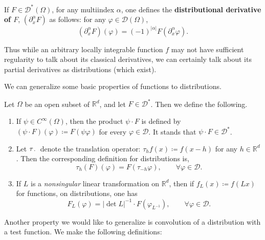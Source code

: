 \documentclass{article}
\begin{document}
\begin{definition}
	If $F \in \mathcal{D}^{\ast}(\Omega)$, for any multiindex $\alpha$, one defines the \textbf{distributional derivative of $F$}, $(\partial_{x}^{\alpha}F)$ as follows: for any $\varphi \in\mathcal{D}(\Omega)$, 
	\begin{equation}
		(\partial_{x}^{\alpha}F)(\varphi) = (-1)^{|\alpha|}F(\partial_{x}^{\alpha}\varphi). 
		\label{eq:dist_der}
	\end{equation}
\end{definition}
Thus while an arbitrary locally integrable function $f$ may not have sufficient regularity to talk about its classical derivatives, we can certainly talk about its partial derivatives as distributions (which exist). 

We can generalize some basic properties of functions to distributions. 

\begin{definition}
	Let $\Omega$ be an open subset of $\mathbb{R}^{d}$, and let $F \in \mathcal{D}^{\ast}$. Then we define the following. \vspace{-1.2em}
	\begin{enumerate}[itemsep =-2pt]
		\item If $\psi \in C^{\infty}(\Omega)$, then the product $\psi \cdot F$ is defined by $(\psi \cdot F)(\varphi) \coloneqq F(\psi \varphi)$ for every $\varphi \in \mathcal{D}$. It stands that $\psi \cdot F \in \mathcal{D}^{\ast}$. 
		\item Let $\tau_{\hspace{2pt}\cdot\hspace{2pt}}$ denote the translation operator: $\tau_{h}f(x) \coloneqq f(x - h)$ for any $h \in \mathbb{R}^{d}$. Then the corresponding definition for distributions is, 
		\begin{equation*}
			\tau_{h}(F)(\varphi) = F(\tau_{-h}\varphi), \qquad \forall \varphi \in \mathcal{D}. 
		\end{equation*}
		\item If $L$ is a \textit{nonsingular} linear transformation on $\mathbb{R}^{d}$, then if $f_{L}(x) \coloneqq f(Lx)$ for functions, on distributions, one has 
			\begin{equation*}
				F_{L}(\varphi) = |\det{L}|^{-1} \cdot F(\varphi_{L^{-1}}), \qquad \forall \varphi \in \mathcal{D}. 
			\end{equation*}
	\end{enumerate}
\end{definition}

Another property we would like to generalize is convolution of a distribution with a test function. We make the following definitions: 
\end{document}
